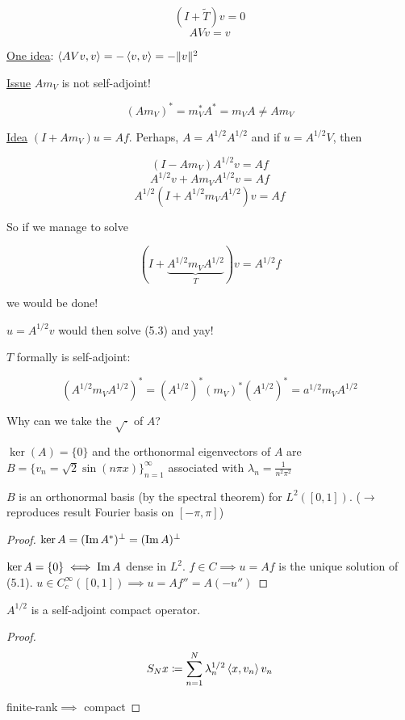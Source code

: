 \[(I+\tilde T)v=0\]
\[AVv=v\]

\underline{One idea}: $\left\langle AVv,v\right\rangle=-\left\langle v,v\right\rangle=-\|v\|^2$

\underline{Issue} $Am_V$ is not self-adjoint!

\[(Am_V)^*=m_V^*A^*=m_VA\neq Am_V\]

\underline{Idea} $(I+Am_V)u=Af$. Perhaps, $A=A^{1/2}A^{1/2}$ and if $u=A^{1/2}V$, then 

\[(I-Am_V)A^{1/2}v=Af\]
\[A^{1/2}v+Am_VA^{1/2}v=Af\]
\[A^{1/2}(I+A^{1/2}m_VA^{1/2})v=Af\]

So if we manage to solve 

\begin{equation}
    (I+\underbrace{A^{1/2}m_VA^{1/2}}_{T})v=A^{1/2}f
\end{equation}

we would be done!

$u=A^{1/2}v$ would then solve (5.3) and yay!

$T$ formally is self-adjoint:

\[(A^{1/2}m_V A^{1/2})^*=(A^{1/2})^*(m_V)^*(A^{1/2})^*=a^{1/2}m_V A^{1/2}\]

Why can we take the $\sqrt{\cdot}$ of $A$?

\begin{fproposition}
    $\ker(A)=\{0\}$ and the orthonormal eigenvectors of $A$ are $B=\{v_n=\sqrt{2}\sin(n\pi x)\}_{n=1}^\infty$ associated with $\lambda_n=\frac{1}{n^2\pi^2}$
\end{fproposition}

\begin{fremark}
    $B$ is an orthonormal basis (by the spectral theorem) for $L^2([0,1])$. ($\to$ reproduces result Fourier basis on $[-\pi,\pi]$)
\end{fremark}

\begin{proof}
    $\ker A=(\operatorname{Im} A^*)^\perp=(\operatorname{Im} A)^\perp$

    $\ker A=\{0\}\iff \operatorname{Im} A$ dense in $L^2$. $f\in C\implies u=Af$ is the unique solution of (5.1). $u\in C^\infty_c([0,1])\implies u=Af''=A(-u'')$

\end{proof}

\begin{fproposition}
    $A^{1/2}$ is a self-adjoint compact operator.
\end{fproposition}

\begin{proof}
    \[S_Nx\coloneqq\sum_{n=1}^N \lambda_n^{1/2}\left\langle x,v_n\right\rangle v_n\]

    finite-rank$\implies$ compact

\end{proof}

